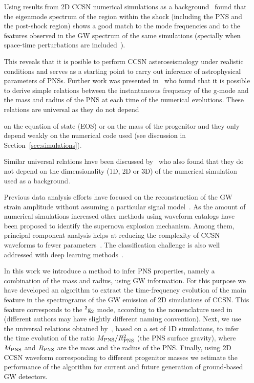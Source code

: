 Using results from 2D CCSN numerical simulations as a background~\citep{Torres:2018, Torres:2019a} found that the eigenmode spectrum of the region within the shock (including the PNS and the post-shock region) 
shows a good match to the mode frequencies and to the features observed in the GW spectrum of the same simulations (specially when space-time perturbations are included~\citep{Torres:2019a}).

This reveals that it is posible to perform CCSN asteroseismology {under realistic conditions} and serves as a starting point to carry out inference of astrophysical parameters of PNSs. Further work was presented in~\citep{Torres:2019b} who found that it is possible to derive simple relations between the instantaneous frequency of the g-mode and the mass and radius of the PNS {at each time of the numerical evolutions}. These relations are universal as they do not depend {on the equation of state (EOS) or on the mass of the progenitor {and they only depend weakly on} the numerical code used {(see discussion in Section~\ref{sec:simulations})}. {Similar universal relations have been discussed by~\citep{Sotani:2020a,Sotani:2020b} who also found that they do not depend on the dimensionality (1D, 2D or 3D) of the numerical simulation used as a background.

Previous data analysis efforts have focused on the reconstruction of the GW strain amplitude
without assuming a particular signal model~\citep{Summerscales:2008,Klimenko:2015ypf,CornLitt}. As the amount of numerical
simulations increased other methods using waveform catalogs have been proposed to identify
the supernova explosion mechanism.
Among them, principal component analysis helps at reducing the complexity of CCSN waveforms to fewer
parameters~\citep{Heng:2009,roever:09,Edwards:2014,powell:2016,powell:2017,Roma:2019kcd}.
The classification challenge is also well addressed with deep learning methods~\citep{astone:2018,Chan:2019fuz}.
    
{In this work we introduce a method to infer PNS properties, namely a combination of the mass and radius, using GW information. For this purpose we have developed an algorithm to  
extract the time-frequency evolution of the main feature in the spectrograms of the GW emission of 2D simulations of CCSN. This feature corresponds to the $^2\rm{g}_2$ mode, according to the nomenclature used in~\citep{Torres:2019b} (different authors may have slightly different naming convention). Next, we use the universal relations obtained by~\citep{Torres:2019b}{, based on a set of 1D simulations,} to infer the time evolution of the ratio $M_{\rm PNS}/R_{\rm PNS}^2$ (the PNS surface gravity), where  $M_{\rm PNS}$ and $R_{\rm PNS}$ are the mass and the radius of the PNS.} Finally, using 2D CCSN waveform corresponding to different progenitor masses we estimate the performance of the algorithm for current and future generation of ground-based GW detectors.

}}
